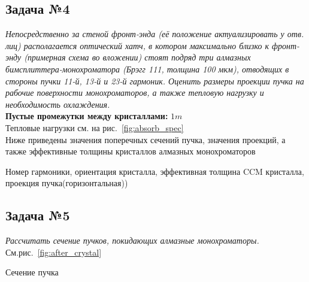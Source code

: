 \documentclass[14pt,a4paper]{extarticle}
\numberwithin{equation}{section}
\begin{document}
\subsection{Задача №4}
\textit{Непосредственно за стеной фронт-энда (её положение актуализировать у отв. лиц) располагается оптический хатч, в котором максимально близко к фронт-энду (примерная схема во вложении) стоят подряд три алмазных бимсплиттера-монохроматора (Брэгг 111, толщина 100 мкм), отводящих в стороны пучки 11-й, 13-й и 23-й гармоник. Оценить размеры проекции пучка на рабочие поверхности монохроматоров, а также тепловую нагрузку и необходимость охлаждения.}\\
\textbf{Пустые промежутки между кристаллами:} $1m$\\
Тепловые нагрузки см. на рис.~\ref{fig:absorb_spec}\\
Ниже приведены значения поперечных сечений пучка, значения проекций, а также эффективные толщины кристаллов алмазных монохроматоров\\

\begin{table}[h!]
	\renewcommand*\dtlrealalign{S}
	\caption{Номер гармоники, ориентация кристалла, эффективная толщина CCM кристалла, проекция пучка(горизонтальная)) }
	\centering
\end{table}

\subsection{Задача №5}
\textit{Рассчитать сечение пучков, покидающих алмазные монохроматоры.}\\
См.рис.~\ref{fig:after_crystal}
\begin{table}[h!]
	\renewcommand*\dtlrealalign{S}
	\caption{Сечение пучка}
	\centering
\end{table}
\end{document}
